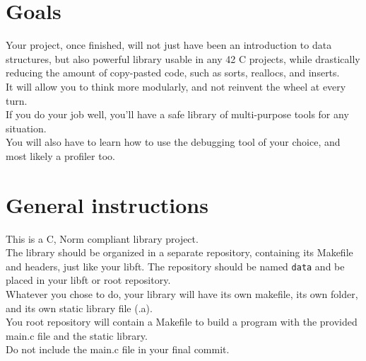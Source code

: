 \documentclass{42-en}
\begin{document}
\chapter{Goals}

    Your project, once finished, will not just have been an introduction to data structures,
    but also powerful library usable in any 42 C projects, while drastically reducing
    the amount of copy-pasted code, such as sorts, reallocs, and inserts.\\

    It will allow you to think more modularly, and not reinvent the wheel at every turn.\\

    If you do your job well, you'll have a safe library of multi-purpose tools for any situation.\\

    You will also have to learn how to use the debugging tool of your choice, and most likely
    a profiler too.

\chapter{General instructions}

    This is a C, Norm compliant library project.\\

    The library should be organized in a separate repository, containing its
    Makefile and headers, just like your libft. The repository should be
    named \texttt{data} and be placed in your libft or root repository.\\

    Whatever you chose to do, your library will have its own makefile,
    its own folder, and its own static library file (.a).\\
    
    You root repository will contain a Makefile to build a program
    with the provided main.c file and the static library.\\

    Do not include the main.c file in your final commit.\\
\end{document}
